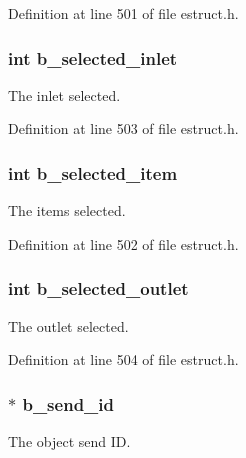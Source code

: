 Definition at line 501 of file estruct.\-h.

\hypertarget{struct__edspbox_a0cebb4789c213079e0490e86c10c2893}{
\subsubsection[{b\-\_\-selected\-\_\-inlet}]{\setlength{\rightskip}{0pt plus 5cm}int b\-\_\-selected\-\_\-inlet}}\label{struct__edspbox_a0cebb4789c213079e0490e86c10c2893}
The inlet selected. 

Definition at line 503 of file estruct.\-h.

\hypertarget{struct__edspbox_a1f65b6d093e53fd85bed085ce0c5dd8e}{
\subsubsection[{b\-\_\-selected\-\_\-item}]{\setlength{\rightskip}{0pt plus 5cm}int b\-\_\-selected\-\_\-item}}\label{struct__edspbox_a1f65b6d093e53fd85bed085ce0c5dd8e}
The items selected. 

Definition at line 502 of file estruct.\-h.

\hypertarget{struct__edspbox_acbf0482cb9c6e192e2059775acc1ac86}{
\subsubsection[{b\-\_\-selected\-\_\-outlet}]{\setlength{\rightskip}{0pt plus 5cm}int b\-\_\-selected\-\_\-outlet}}\label{struct__edspbox_acbf0482cb9c6e192e2059775acc1ac86}
The outlet selected. 

Definition at line 504 of file estruct.\-h.

\hypertarget{struct__edspbox_ac59460230e622f821660b599e2f96ca9}{
\subsubsection[{b\-\_\-send\-\_\-id}]{$\ast$ b\-\_\-send\-\_\-id}}\label{struct__edspbox_ac59460230e622f821660b599e2f96ca9}
The object send I\-D. 

